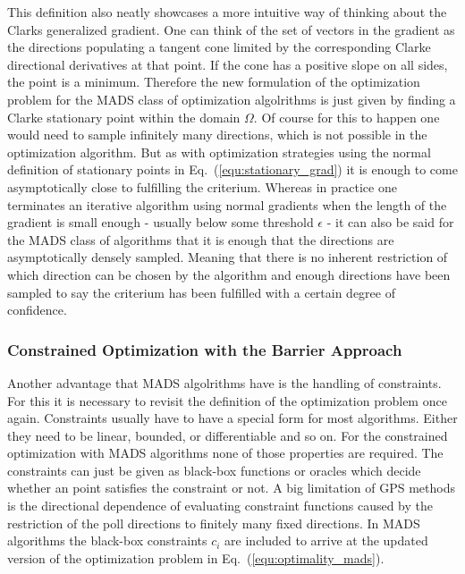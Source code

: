 \documentclass[a4paper,10pt]{article}
\newcommand{\equref}[1]{Eq.~(\ref{#1})}
\begin{document}
    This definition also neatly showcases a more intuitive way of thinking
    about the Clarks generalized gradient.
    One can think of the set of vectors in the gradient as the directions
    populating a tangent cone limited by the corresponding Clarke directional
    derivatives at that point.
    If the cone has a positive slope on all sides, the point is a minimum.
    Therefore the new formulation of the optimization problem for
    the MADS class of optimization algolrithms is just given by finding
    a Clarke stationary point within the domain $\Omega$.
    Of course for this to happen one would need to sample infinitely
    many directions, which is not possible in the optimization
    algorithm.
    But as with optimization strategies using the normal 
    definition of stationary points in \equref{equ:stationary_grad} it
    is enough to come asymptotically close to fulfilling the
    criterium.
    Whereas in practice one terminates an iterative algorithm using
    normal gradients when the length of the gradient is small
    enough - usually below some threshold $\epsilon$ - it can
    also be said for the MADS class of algorithms that it is
    enough that the directions are asymptotically densely
    sampled.
    Meaning that there is no inherent restriction of which direction
    can be chosen by the algorithm and enough directions have been sampled
    to say the criterium has been fulfilled with a certain degree of
    confidence. 

    \subsubsection{Constrained Optimization with the Barrier Approach}

    Another advantage that MADS algolrithms have is the handling of
    constraints.
    For this it is necessary to revisit the definition of the optimization
    problem once again.
    Constraints usually have to have a special form for most algorithms.
    Either they need to be linear, bounded, or differentiable and so on.
    For the constrained optimization with MADS algorithms none of
    those properties are required.
    The constraints can just be given as black-box functions or
    oracles which decide whether an point satisfies the constraint
    or not.
    A big limitation of GPS methods is the directional dependence of
    evaluating constraint functions caused by the restriction of the poll
    directions to finitely many fixed directions.
    In MADS algorithms the black-box constraints $c_i$ are included to arrive
    at the updated version of the optimization problem in
    \equref{equ:optimality_mads}.
\end{document}
